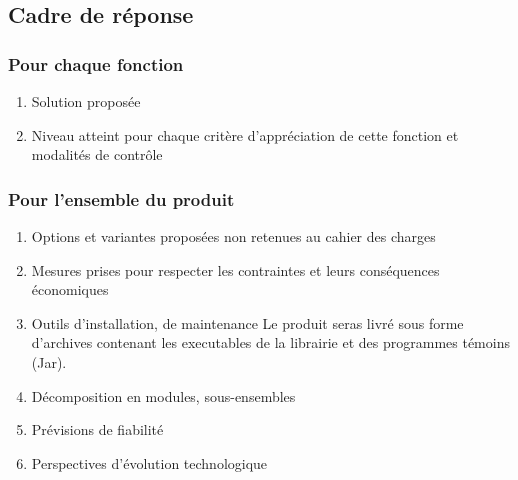 \subsection{Cadre de réponse}

\subsubsection{Pour chaque fonction}
\begin{enumerate}
\item{Solution proposée}
\item{Niveau atteint pour chaque critère d’appréciation de cette fonction et modalités de contrôle}
\end{enumerate}

\subsubsection{Pour l’ensemble du produit}
\begin{enumerate}
\item{Options et variantes proposées non retenues au cahier des charges}
\item{Mesures prises pour respecter les contraintes et leurs conséquences économiques}

\item{Outils d’installation, de maintenance}
Le produit seras livré sous forme d'archives contenant les executables de la librairie et des programmes témoins (Jar).


\item{Décomposition en modules, sous-ensembles}
\item{Prévisions de fiabilité}
\item{ Perspectives d’évolution technologique}
\end{enumerate}